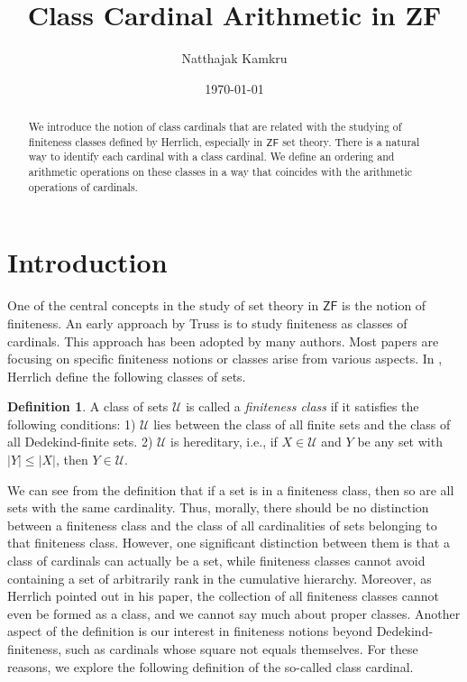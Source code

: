 \documentclass{amsart}
\title[Class Cardinal Arithmetic]{Class Cardinal Arithmetic in ZF}
\author{Natthajak Kamkru}
\date{\today}
\newcommand{\ZF}{\ensuremath{\mathsf{ZF}}}
\renewcommand{\leq}{\leqslant}
\newcommand{\1}{\ensuremath{\mathds{1}}}
\theoremstyle{plain}
\theoremstyle{boldrk}
\theoremstyle{definition}
\newtheorem{defn}[thm]{Definition}
\begin{document}
\begin{abstract}We introduce the notion of class cardinals that are related with the studying of finiteness classes defined by Herrlich, especially in $\ZF$ set theory. There is a natural way to identify each cardinal with a class cardinal. We define an ordering and arithmetic operations on these classes in a way that coincides with the arithmetic operations of cardinals. 
\end{abstract}

\maketitle

\tableofcontents

\section{Introduction}


One of the central concepts in the study of set theory in $\ZF$ is the notion of finiteness. An early approach by Truss \cite{Truss} is to study finiteness as classes of cardinals. This approach has been adopted by many authors. Most papers are focusing on specific finiteness notions or classes arise from various aspects. In \cite{FIF}, Herrlich define the following classes of sets.

\begin{defn}
 A class of sets $\mathcal{U}$ is called a \emph{finiteness class} if it satisfies the following conditions: 1) $\mathcal{U}$ lies between the class of all finite sets and the class of all Dedekind-finite sets. 2) $\mathcal{U}$ is hereditary, i.e., if $X\in\mathcal{U}$ and $Y$ be any set with $|Y|\leq|X|$, then $Y\in\mathcal{U}$. 
\end{defn}


We can see from the definition that if a set is in a finiteness class, then so are all sets with the same cardinality. Thus, morally, there should be no distinction between a finiteness class and the class of all cardinalities of sets belonging to that finiteness class. However, one significant distinction between them is that a class of cardinals can actually be a set, while finiteness classes cannot avoid containing a set of arbitrarily rank in the cumulative hierarchy. Moreover, as Herrlich pointed out in his paper, the collection of all finiteness classes cannot even be formed as a class, and we cannot say much about proper classes. Another aspect of the definition is our interest in finiteness notions beyond Dedekind-finiteness, such as cardinals whose square not equals themselves. For these reasons, we explore the following definition of the so-called class cardinal.
\end{document}
